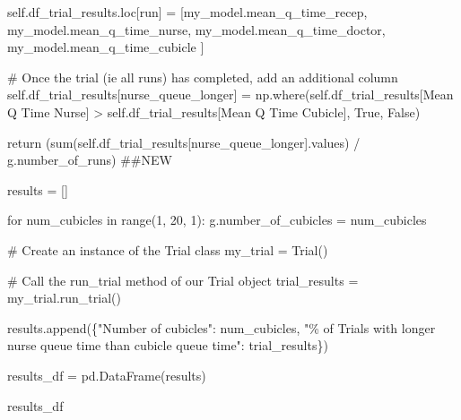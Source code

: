 \documentclass[
  letterpaper,
  DIV=11,
  numbers=noendperiod]{scrreprt}
\newenvironment{Shaded}{\begin{snugshade}}{\end{snugshade}}
\newcommand{\BuiltInTok}[1]{\textcolor[rgb]{0.00,0.23,0.31}{#1}}
\newcommand{\CommentTok}[1]{\textcolor[rgb]{0.37,0.37,0.37}{#1}}
\newcommand{\ControlFlowTok}[1]{\textcolor[rgb]{0.00,0.23,0.31}{#1}}
\newcommand{\DecValTok}[1]{\textcolor[rgb]{0.68,0.00,0.00}{#1}}
\newcommand{\KeywordTok}[1]{\textcolor[rgb]{0.00,0.23,0.31}{#1}}
\newcommand{\NormalTok}[1]{\textcolor[rgb]{0.00,0.23,0.31}{#1}}
\newcommand{\OperatorTok}[1]{\textcolor[rgb]{0.37,0.37,0.37}{#1}}
\newcommand{\SpecialCharTok}[1]{\textcolor[rgb]{0.37,0.37,0.37}{#1}}
\newcommand{\StringTok}[1]{\textcolor[rgb]{0.13,0.47,0.30}{#1}}
\newcommand{\VariableTok}[1]{\textcolor[rgb]{0.07,0.07,0.07}{#1}}
\begin{document}
\begin{Shaded}
\begin{Highlighting}[]
            \VariableTok{self}\NormalTok{.df\_trial\_results.loc[run] }\OperatorTok{=}\NormalTok{ [my\_model.mean\_q\_time\_recep,}
\NormalTok{                                              my\_model.mean\_q\_time\_nurse,}
\NormalTok{                                              my\_model.mean\_q\_time\_doctor,}
\NormalTok{                                              my\_model.mean\_q\_time\_cubicle}
\NormalTok{                                              ]}

        \CommentTok{\# Once the trial (ie all runs) has completed, add an additional column}
        \VariableTok{self}\NormalTok{.df\_trial\_results[}\StringTok{\textquotesingle{}nurse\_queue\_longer\textquotesingle{}}\NormalTok{] }\OperatorTok{=}\NormalTok{ np.where(}\VariableTok{self}\NormalTok{.df\_trial\_results[}\StringTok{\textquotesingle{}Mean Q Time Nurse\textquotesingle{}}\NormalTok{] }\OperatorTok{\textgreater{}} \VariableTok{self}\NormalTok{.df\_trial\_results[}\StringTok{\textquotesingle{}Mean Q Time Cubicle\textquotesingle{}}\NormalTok{], }\VariableTok{True}\NormalTok{, }\VariableTok{False}\NormalTok{)}

        \ControlFlowTok{return}\NormalTok{ (}\BuiltInTok{sum}\NormalTok{(}\VariableTok{self}\NormalTok{.df\_trial\_results[}\StringTok{\textquotesingle{}nurse\_queue\_longer\textquotesingle{}}\NormalTok{].values) }\OperatorTok{/}\NormalTok{ g.number\_of\_runs) }\CommentTok{\#\#NEW}
\end{Highlighting}
\end{Shaded}

\begin{Shaded}
\begin{Highlighting}[]
\NormalTok{results }\OperatorTok{=}\NormalTok{ []}

\ControlFlowTok{for}\NormalTok{ num\_cubicles }\KeywordTok{in} \BuiltInTok{range}\NormalTok{(}\DecValTok{1}\NormalTok{, }\DecValTok{20}\NormalTok{, }\DecValTok{1}\NormalTok{):}
\NormalTok{    g.number\_of\_cubicles }\OperatorTok{=}\NormalTok{ num\_cubicles}

    \CommentTok{\# Create an instance of the Trial class}
\NormalTok{    my\_trial }\OperatorTok{=}\NormalTok{ Trial()}

    \CommentTok{\# Call the run\_trial method of our Trial object}
\NormalTok{    trial\_results }\OperatorTok{=}\NormalTok{ my\_trial.run\_trial()}

\NormalTok{    results.append(\{}\StringTok{"Number of cubicles"}\NormalTok{: num\_cubicles,}
      \StringTok{"}\SpecialCharTok{\% o}\StringTok{f Trials with longer nurse queue time than cubicle queue time"}\NormalTok{: trial\_results\})}

\NormalTok{results\_df }\OperatorTok{=}\NormalTok{ pd.DataFrame(results)}

\NormalTok{results\_df}
\end{Highlighting}
\end{Shaded}
\end{document}

